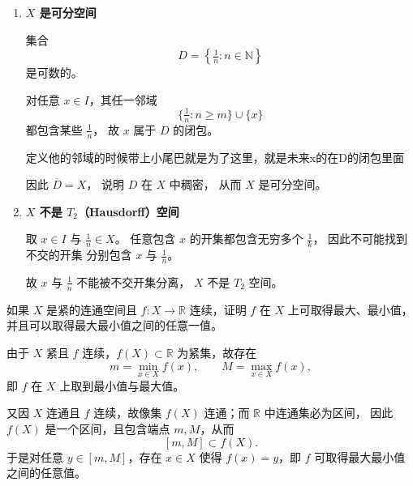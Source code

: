 \begin{solution}
\begin{enumerate}
若 $x\neq y$ 且 $x,y\in I$，则 $y\notin U_x$（因为 $U_x$ 中除 $x$ 外只包含形如 $1/n$ 的点，
而 $y$ 是无理数）。于是 $y\notin B_x$。
但 $y\in B_y$，从而
\[
B_x\neq B_y.
\]
因此映射 $x\mapsto B_x$ 是从不可数集 $I$ 到 $\mathcal{B}$ 的单射，
故 $\mathcal{B}$ 必为不可数，这与 $\mathcal{B}$ 可数矛盾。

因此 $X$ 不是第二可数空间。
\item \textbf{$X$ 是可分空间}

集合
\[
D=\left\{\tfrac{1}{n}:n\in\mathbb{N}\right\}
\]
是可数的。

对任意 $x\in I$，其任一邻域
\[
\{\tfrac{1}{n}:n\ge m\}\cup\{x\}
\]
都包含某些 $\tfrac{1}{n}$，
故 $x$ 属于 $D$ 的闭包。
\begin{dxtips}
    定义他的邻域的时候带上小尾巴就是为了这里，就是未来x的在D的闭包里面
\end{dxtips}
因此 $\overline{D}=X$，
说明 $D$ 在 $X$ 中稠密，
从而 $X$ 是可分空间。

\item \textbf{$X$ 不是 $T_2$（Hausdorff）空间}

取 $x\in I$ 与 $\tfrac{1}{n}\in X$。
任意包含 $x$ 的开集都包含无穷多个 $\tfrac{1}{k}$，
因此不可能找到不交的开集
分别包含 $x$ 与 $\tfrac{1}{n}$。

故 $x$ 与 $\tfrac{1}{n}$ 不能被不交开集分离，
$X$ 不是 $T_2$ 空间。
\end{enumerate}
\end{solution}
\begin{homework}[14]
如果 $X$ 是紧的连通空间且 $f:X\to\mathbb{R}$ 连续，证明 $f$ 在 $X$ 上可取得最大、最小值，并且可以取得最大最小值之间的任意一值。
\end{homework}
\begin{solution}
由于 $X$ 紧且 $f$ 连续，$f(X)\subset\mathbb R$ 为紧集，故存在
\[
m=\min_{x\in X}f(x),\qquad M=\max_{x\in X}f(x),
\]
即 $f$ 在 $X$ 上取到最小值与最大值。

又因 $X$ 连通且 $f$ 连续，故像集 $f(X)$ 连通；而 $\mathbb R$ 中连通集必为区间，
因此 $f(X)$ 是一个区间，且包含端点 $m,M$，从而
\[
[m,M]\subset f(X).
\]
于是对任意 $y\in[m,M]$，存在 $x\in X$ 使得 $f(x)=y$，即 $f$ 可取得最大最小值之间的任意值。
\end{solution}

